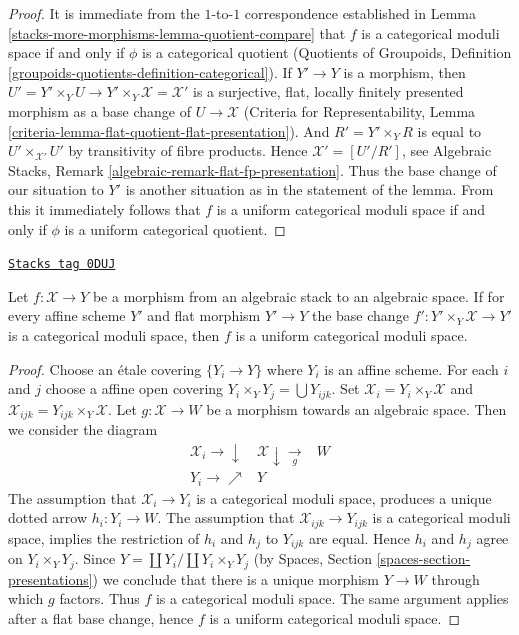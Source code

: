 \begin{proof}
It is immediate from the $1$-to-$1$ correspondence established in
Lemma \ref{stacks-more-morphisms-lemma-quotient-compare} that $f$ is a categorical moduli space
if and only if $\phi$ is a categorical quotient
(Quotients of Groupoids, Definition
\ref{groupoids-quotients-definition-categorical}).
If $Y' \to Y$ is a morphism, then
$U' = Y' \times_Y U \to Y' \times_Y \mathcal{X} = \mathcal{X}'$
is a surjective, flat, locally finitely presented morphism
as a base change of $U \to \mathcal{X}$
(Criteria for Representability, Lemma
\ref{criteria-lemma-flat-quotient-flat-presentation}).
And $R' = Y' \times_Y R$ is equal to $U' \times_{\mathcal{X}'} U'$
by transitivity of fibre products.
Hence $\mathcal{X}' = [U'/R']$, see
Algebraic Stacks, Remark \ref{algebraic-remark-flat-fp-presentation}.
Thus the base change of our situation to $Y'$ is another situation
as in the statement of the lemma. From this it immediately
follows that $f$ is a uniform categorical moduli space
if and only if $\phi$ is a uniform categorical quotient.
\end{proof}

\begin{lemma}
\label{stacks-more-morphisms-lemma-check-uniform-categorical-quotient-on-affines}
\href{https://stacks.math.columbia.edu/tag/0DUJ}{\texttt{Stacks tag 0DUJ}}

Let $f : \mathcal{X} \to Y$ be a morphism from an algebraic stack
to an algebraic space. If for every affine scheme $Y'$ and flat
morphism $Y' \to Y$ the base change
$f' : Y' \times_Y \mathcal{X} \to Y'$ is a categorical moduli space,
then $f$ is a uniform categorical moduli space.
\end{lemma}

\begin{proof}
Choose an \'etale covering $\{Y_i \to Y\}$ where $Y_i$ is an affine scheme.
For each $i$ and $j$ choose a affine open covering
$Y_i \times_Y Y_j = \bigcup Y_{ijk}$.
Set $\mathcal{X}_i = Y_i \times_Y \mathcal{X}$ and
$\mathcal{X}_{ijk} = Y_{ijk} \times_Y \mathcal{X}$.
Let $g : \mathcal{X} \to W$ be a morphism towards
an algebraic space. Then we consider the diagram
$$
\begin{array}{ccc}\mathcal{X}_i \longrightarrow\downarrow & \mathcal{X} \downarrow\underset{g}{\longrightarrow} & W \\ Y_i \longrightarrow\nearrow & Y & \end{array}
$$
The assumption that $\mathcal{X}_i \to Y_i$ is a categorical moduli
space, produces a unique dotted arrow $h_i : Y_i \to W$.
The assumption that $\mathcal{X}_{ijk} \to Y_{ijk}$ is a categorical
moduli space, implies the restriction of $h_i$ and $h_j$ to
$Y_{ijk}$ are equal. Hence $h_i$ and $h_j$ agree on $Y_i \times_Y Y_j$.
Since $Y = \coprod Y_i / \coprod Y_i \times_Y Y_j$
(by Spaces, Section \ref{spaces-section-presentations}) we conclude
that there is a unique morphism $Y \to W$ through which $g$ factors.
Thus $f$ is a categorical moduli space. The same argument applies
after a flat base change, hence $f$ is a uniform categorical moduli space.
\end{proof}

